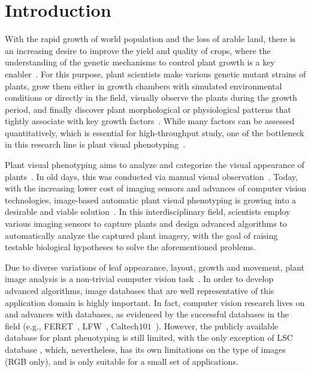 \section{Introduction}
\label{sec:intro}

With the rapid growth of world population  and the loss of arable land, there is an increasing desire to improve the yield and quality of crops, where the understanding of the genetic mechanisms to control plant growth is a key enabler~\cite{doos2002population}.
%
For this purpose, plant scientists make various genetic mutant strains of plants, grow them either in  growth chambers with simulated environmental conditions or directly in the field, visually observe the plants during the growth period, and finally discover plant morphological or physiological patterns that tightly associate with key growth factors~\cite{houle2010phenomics}.
%
While many factors can be assessed quantitatively, which is essential for high-throughput study, one of the bottleneck in this research line is plant visual phenotyping~\cite{walter2015plant}.

Plant visual phenotyping aims to analyze and categorize the visual appearance of plants~\cite{}. In old days, this was conducted via manual visual observation~\cite{Erblichkeit1903}. Today, with the increasing lower cost of imaging sensors and advances of computer vision technologies, image-based automatic plant visual phenotyping is growing into a desirable and viable solution~\cite{cruz2015depi}. In this interdisciplinary field, scientists employ various imaging sensors to capture plants and design advanced algorithms to automatically analyze the captured plant imagery, with the goal of raising testable biological hypotheses to solve the aforementioned problems.

Due to diverse variations of leaf appearance, layout, growth and movement, plant image analysis is a non-trivial computer vision task~\cite{}. In order to develop advanced algorithms, image databases that are well representative of this application domain is highly important. In fact, computer vision research lives on and advances with databases, as evidenced by the successful databases in the field (e.g., FERET~\cite{Phillips2000}, LFW~\cite{LFW}, Caltech$101$~\cite{Fei-Fei2004}). However, the publicly available database for plant phenotyping is still limited, with the only exception of LSC database \cite{scharr2014annotated}, which, nevertheless, has its own limitations on the type of images (RGB only), and is only suitable for a small set of applications.

